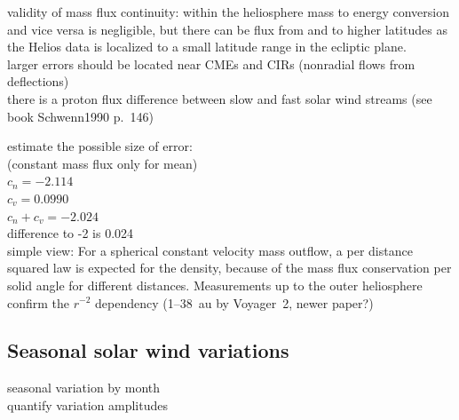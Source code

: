 validity of mass flux continuity: within the heliosphere mass to energy conversion and vice versa is negligible, but there can be flux from and to higher latitudes as the Helios data is localized to a small latitude range in the ecliptic plane.\\
larger errors should be located near CMEs and CIRs (nonradial flows from deflections)\\
there is a proton flux difference between slow and fast solar wind streams (see book Schwenn1990 p.~146)

estimate the possible size of error:\\
(constant mass flux only for mean)\\
$c_n = -2.114$\\
$c_v = 0.0990$\\
$c_n + c_v = -2.024$\\
difference to -2 is 0.024\\

simple view: For a spherical constant velocity mass outflow, a per distance squared law is expected for the density, because of the mass flux conservation per solid angle for different distances. Measurements up to the outer heliosphere confirm the $r^{-2}$ dependency (1--38~au by Voyager~2, \citep{Belcher1993} newer paper?)\\


\subsection{Seasonal solar wind variations}
seasonal variation by month\\
quantify variation amplitudes\\

